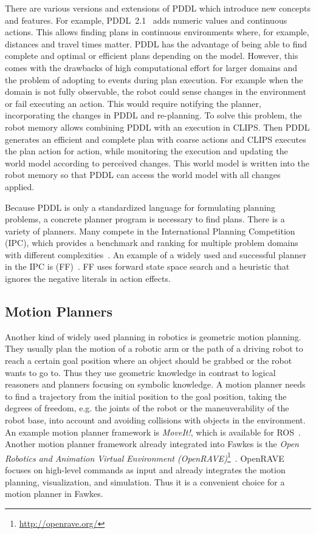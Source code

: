 There are various versions and extensions of PDDL which introduce new
concepts and features. For example, PDDL~2.1~\cite{PDDL2.1} adds
numeric values and continuous actions. This allows finding plans in
continuous environments where, for example, distances and travel times
matter. PDDL has the advantage of being able to find complete and
optimal or efficient plans depending on the model. However, this comes
with the drawbacks of high computational effort for larger domains and
the problem of adopting to events during plan execution. For example
when the domain is not fully observable, the robot could sense changes
in the environment or fail executing an action. This would require
notifying the planner, incorporating the changes in PDDL and
re-planning. To solve this problem, the robot memory allows
combining PDDL with an execution in CLIPS. Then PDDL generates an
efficient and complete plan with coarse actions and CLIPS executes the
plan action for action, while monitoring the execution and updating
the world model according to perceived changes. This world model is
written into the robot memory so that PDDL can access the world model
with all changes applied.  %

Because PDDL is only a standardized language for formulating planning
problems, a concrete planner program is necessary to find plans. There
is a variety of planners. Many compete in the International
Planning Competition (IPC), which provides a benchmark and ranking for
multiple problem domains with different
complexities~\cite{planning-competition}. An example of a widely used
and successful planner in the IPC is (FF)~\cite{hoffmannFF}. FF uses
forward state space search and a heuristic that ignores the negative
literals in action effects.

\subsection{Motion Planners}
Another kind of widely used planning in robotics is geometric motion
planning. They usually plan the motion of a robotic arm or the path of
a driving robot to reach a certain goal position where an object
should be grabbed or the robot wants to go to. Thus they use geometric
knowledge in contrast to logical reasoners and planners focusing on
symbolic knowledge.  A motion planner needs to find a trajectory from
the initial position to the goal position, taking the degrees of
freedom, e.g. the joints of the robot or the maneuverability of the
robot base, into account and avoiding collisions with objects in the
environment. An example motion planner framework is \emph{MoveIt!},
which is available for ROS~\cite{MoveIt}. Another motion planner
framework already integrated into Fawkes is the \emph{Open Robotics
  and Animation Virtual Environment
  (OpenRAVE)}\footnote{\url{http://openrave.org/}}~\cite{OpenRave}. OpenRAVE
focuses on high-level commands as input and already integrates the
motion planning, visualization, and simulation. Thus it is a
convenient choice for a motion planner in Fawkes.


